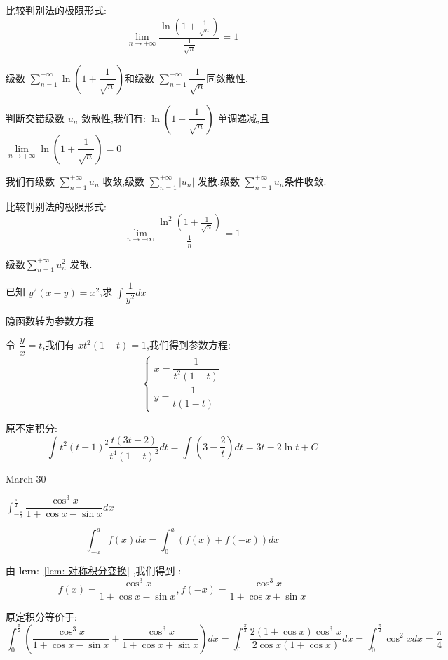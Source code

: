 \begin{solution}
	
	比较判别法的极限形式: 
	$$\lim\limits_{n\rightarrow +\infty}\frac{\ln(1+\frac{1}{\sqrt{n}})}{\frac{1}{\sqrt{n}}}=1$$
	
	级数 $\sum\limits_{n=1}^{+\infty}\ln(1+\dfrac{1}{\sqrt{n}})$和级数 $\sum\limits_{n=1}^{+\infty}\dfrac{1}{\sqrt{n}}$同敛散性.
	
	判断交错级数 $u_{n}$ 敛散性,我们有: $\ln(1+\dfrac{1}{\sqrt{n}})$ 单调递减,且 $\lim\limits_{n\rightarrow+\infty}\ln(1+\dfrac{1}{\sqrt{n}})=0$
	
	我们有级数 $\sum\limits_{n=1}^{+\infty}u_{n}$ 收敛,级数 $\sum\limits_{n=1}^{+\infty}|u_{n}|$ 发散,级数 $\sum\limits_{n=1}^{+\infty}u_{n}$条件收敛.
	
	比较判别法的极限形式: 
	$$\lim\limits_{n\rightarrow +\infty}\frac{\ln^{2}(1+\frac{1}{\sqrt{n}})}{\frac{1}{n}}=1$$
	
	级数$\sum\limits_{n=1}^{+\infty}u^{2}_{n}$ 发散.
\end{solution}

\begin{example}[][Exam: 29.4.15]
	已知 $y^{2}(x-y)=x^2$,求 $\int\dfrac{1}{y^2}dx$
\end{example}

\begin{solution}
	
	隐函数转为参数方程
	
	令 $\dfrac{y}{x}=t$,我们有 $xt^2(1-t)=1$,我们得到参数方程: 
	$$\left\lbrace\begin{array}{l}
		x=\dfrac{1}{t^2(1-t)}\\y=\dfrac{1}{t(1-t)}
	\end{array} \right. $$
	
	原不定积分:  
	$$ \int t^2(t-1)^2\frac{t(3t-2)}{t^4(1-t)^2}dt=\int(3-\frac{2}{t})dt=3t-2\ln t+C$$
\end{solution}

\textcolor{purplea}{March 30}

\begin{example}[][Exam: 29.4.16]
	$\int_{-\frac{\pi}{2}}^{\frac{\pi}{2}}\dfrac{\cos^3 x}{1+\cos x-\sin x}dx$
\end{example}

\begin{lemma}[对称积分变换]\label{lem: 对称积分变换}
	$$\int_{-a}^{a}f(x)dx=\int_{0}^{a}(f(x)+f(-x))dx$$
\end{lemma}
\begin{solution}
	
	由 $\mathbf{lem: }$ \ref{lem: 对称积分变换} ,我们得到 : 
	$$f(x)=\frac{\cos^3 x}{1+\cos x-\sin x},f(-x)=\frac{\cos^3 x}{1+\cos x+\sin x}$$
	
	原定积分等价于: 
	$$\int_{0}^{\frac{\pi}{2}}(\frac{\cos^3 x}{1+\cos x-\sin x}+\frac{\cos^3 x}{1+\cos x+\sin x})dx=\int_{0}^{\frac{\pi}{2}}\frac{2(1+\cos x)\cos^3x}{2\cos x(1+\cos x)}dx=\int_{0}^{\frac{\pi}{2}}\cos^2 xdx=\frac{\pi}{4}$$
\end{solution}

